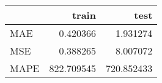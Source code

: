\begin{tabular}{lrr}
\toprule
{} &       train &        test \\
\midrule
MAE  &    0.420366 &    1.931274 \\
MSE  &    0.388265 &    8.007072 \\
MAPE &  822.709545 &  720.852433 \\
\bottomrule
\end{tabular}
